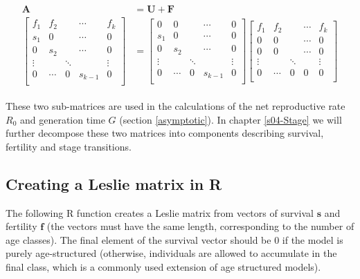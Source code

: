 \documentclass[
]{book}
\begin{document}
\begin{align}
\begin{split}
\mathbf{A}&=\mathbf{U}+\mathbf{F}\\
\left[\begin{matrix} f_1 & f_2 && \cdots & f_k \\ s_1 &0 && \cdots &0\\ 0 &s_2 & &\cdots &0\\ \vdots& &\ddots&&\vdots\\ 0 &\cdots&0 & s_{k-1} &0  \\  \end{matrix}\right] &= \left[\begin{matrix} 0 & 0 && \cdots & 0 \\ s_1 &0 && \cdots &0\\ 0 &s_2 & &\cdots &0\\ \vdots& &\ddots&&\vdots\\ 0 &\cdots&0 & s_{k-1} &0  \\  \end{matrix}\right] \left[\begin{matrix} f_1 & f_2 && \cdots & f_k \\0  &0 && \cdots &0\\ 0 &0 & &\cdots &0\\ \vdots& &\ddots&&\vdots\\ 0 &\cdots&0 & 0 &0  \\  \end{matrix} \right]
\end{split}
\label{eq:LeslieSplit}
\end{align}

These two sub-matrices are used in the calculations of the net reproductive rate \(R_0\) and generation time \(G\) (section \ref{asymptotic}). In chapter \ref{s04-Stage} we will further decompose these two matrices into components describing survival, fertility and stage transitions.

\hypertarget{LeslieR}{%
\subsection{Creating a Leslie matrix in R}\label{LeslieR}}

The following R function creates a Leslie matrix from vectors of survival \(\mathbf{s}\) and fertility \(\mathbf{f}\) (the vectors must have the same length, corresponding to the number of age classes). The final element of the survival vector should be 0 if the model is purely age-structured (otherwise, individuals are allowed to accumulate in the final class, which is a commonly used extension of age structured models).
\end{document}
